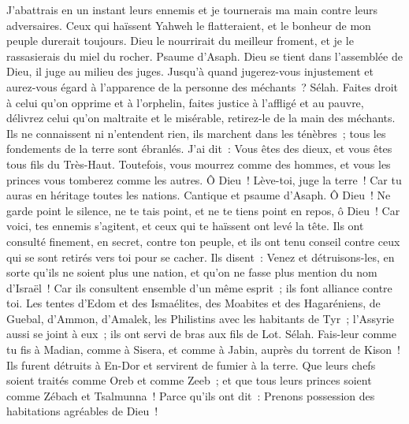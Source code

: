 \begin{multicols}{2}
J'abattrais en un instant leurs ennemis et je tournerais ma main contre leurs adversaires.
Ceux qui haïssent Yahweh le flatteraient, et le bonheur de mon peuple durerait toujours.
Dieu le nourrirait du meilleur froment, et je le rassasierais du miel du rocher.
\VerseOne{}Psaume d'Asaph. Dieu se tient dans l'assemblée de Dieu, il juge au milieu des juges.
Jusqu'à quand jugerez-vous injustement et aurez-vous égard à l'apparence de la personne des méchants~? Sélah.
Faites droit à celui qu'on opprime et à l'orphelin, faites justice à l'affligé et au pauvre,
délivrez celui qu'on maltraite et le misérable, retirez-le de la main des méchants.
Ils ne connaissent ni n'entendent rien, ils marchent dans les ténèbres~; tous les fondements de la terre sont ébranlés.
J'ai dit~: Vous êtes des dieux, et vous êtes tous fils du Très-Haut.
Toutefois, vous mourrez comme des hommes, et vous les princes vous tomberez comme les autres.
Ô Dieu~! Lève-toi, juge la terre~! Car tu auras en héritage toutes les nations.
\VerseOne{}Cantique et psaume d'Asaph.
Ô Dieu~! Ne garde point le silence, ne te tais point, et ne te tiens point en repos, ô Dieu~!
Car voici, tes ennemis s'agitent, et ceux qui te haïssent ont levé la tête.
Ils ont consulté finement, en secret, contre ton peuple, et ils ont tenu conseil contre ceux qui se sont retirés vers toi pour se cacher.
Ils disent~: Venez et détruisons-les, en sorte qu'ils ne soient plus une nation, et qu'on ne fasse plus mention du nom d'Israël~!
Car ils consultent ensemble d'un même esprit~; ils font alliance contre toi.
Les tentes d'Edom et des Ismaélites, des Moabites et des Hagaréniens,
de Guebal, d'Ammon, d'Amalek, les Philistins avec les habitants de Tyr~;
l'Assyrie aussi se joint à eux~; ils ont servi de bras aux fils de Lot. Sélah.
Fais-leur comme tu fis à Madian, comme à Sisera, et comme à Jabin, auprès du torrent de Kison~!
Ils furent détruits à En-Dor et servirent de fumier à la terre.
Que leurs chefs soient traités comme Oreb et comme Zeeb~; et que tous leurs princes soient comme Zébach et Tsalmunna~!
Parce qu'ils ont dit~: Prenons possession des habitations agréables de Dieu~!

\end{multicols}
